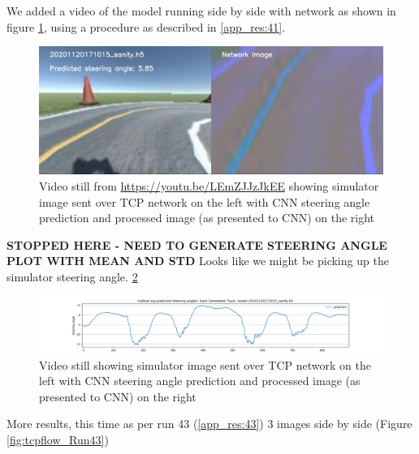 We added a video of the model running side by side with network as shown in figure 
\ref{fig:20201120171015_sanity_sim_network}, using a procedure as described in \ref{app_res:41}.

\begin{figure}[ht]
 \centering 
 \includegraphics[width=\textwidth]{Figures/20201120171015_sanity_sim_network.png}
 \caption{Video still from \href{https://youtu.be/LEmZJJzJkEE}{https://youtu.be/LEmZJJzJkEE} showing simulator image sent over TCP network on the left with CNN steering angle prediction and processed image (as presented to CNN) on the right}
 \label{fig:20201120171015_sanity_sim_network} 
\end{figure}

\textbf{STOPPED HERE - NEED TO GENERATE STEERING ANGLE PLOT WITH MEAN AND STD} Looks like we might be picking up the simulator steering angle.  \ref{fig:sa_GeneratedTrack_20201120171015_sanity}

\begin{figure}[ht]
 \centering 
 \includegraphics[width=\textwidth]{Figures/sa_GeneratedTrack_20201120171015_sanity.h5.png}
 \caption{Video still showing simulator image sent over TCP network on the left with CNN steering angle prediction and processed image (as presented to CNN) on the right}
 \label{fig:sa_GeneratedTrack_20201120171015_sanity} 
\end{figure}
More results, this time as per run 43 (\ref{app_res:43}) 3 images side by side (Figure 
 \ref{fig:tcpflow_Run43})
 
